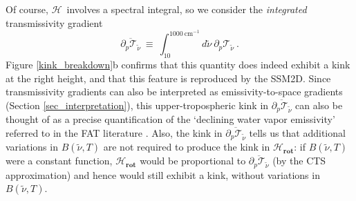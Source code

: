 \documentclass{ametsoc}
\newcommand{\beqn}{\begin{equation}}
\newcommand{\eeqn}{\end{equation}}
\newcommand{\cminverse}{\ensuremath{\mathrm{cm^{-1}}}}
\newcommand{\ppp}{\ensuremath{\partial_p}}
\newcommand{\wv}{\ensuremath{\widetilde{\nu}}}
\newcommand{\trans}{\ensuremath{\mathcal{T}}}
\newcommand{\ch}{\ensuremath{\mathcal{H}}}
\newcommand{\rot}{\ensuremath{\textbf{rot}}}
\begin{document}
Of course, \ch\ involves a spectral integral, so we consider the \emph{integrated} transmissivity gradient
\beqn
	\overline{\ppp \trans_{\wv}} \ \equiv \  \int_{10}^{1000\ \cminverse} d\wv\  \ppp \trans_{\wv} \ .
	\label{int_trans}
\eeqn 
 Figure \ref{kink_breakdown}b confirms that this quantity does indeed exhibit a kink at the right height, and that this feature is reproduced by the SSM2D. Since transmissivity gradients can also be interpreted as emissivity-to-space gradients (Section \ref{sec_interpretation}), this upper-tropospheric kink in $\overline{\ppp \trans_{\wv}}$  can also be thought of as a precise quantification of the `declining water vapor emissivity' referred to in the FAT literature \citep{hartmann2002,hartmann2001}. Also, the kink in $\overline{\ppp \trans_{\wv}}$ tells us that additional variations in $B(\wv,T)$ are not required to produce the kink in $\ch_{\rot}$:  if $B(\wv,T)$ were a constant function, $\ch_{\rot}$ would  be proportional to $\overline{\ppp \trans_{\wv}}$ (by the CTS approximation) and hence would still exhibit a kink, without variations in $B(\wv,T)$.  
\end{document}
